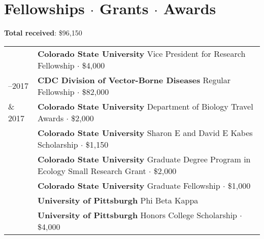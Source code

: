 \documentclass[letterpaper]{deedy-resume} %
\begin{document}

\section{Fellowships $\cdot$ Grants $\cdot$ Awards} 
\raggedright\textbf{Total received}: \$96,150\\
\sectionspace
\begin{tabular}{>{\raggedright\arraybackslash}p{2cm}p{16cm}}
2018 & \textbf{Colorado State University} Vice President for Research Fellowship $\cdot$ \$4,000\\
2015–2017 & \textbf{CDC Division of Vector-Borne Diseases} Regular Fellowship $\cdot$ \$82,000\\
2014 \& 2017 & \textbf{Colorado State University} Department of Biology Travel Awards $\cdot$ \$2,000\\
2015 & \textbf{Colorado State University} Sharon E and David E Kabes Scholarship $\cdot$ \$1,150\\
2014 & \textbf{Colorado State University} Graduate Degree Program in Ecology Small Research Grant $\cdot$ \$2,000\\
2013 & \textbf{Colorado State University} Graduate Fellowship $\cdot$ \$1,000\\
2011 & \textbf{University of Pittsburgh} Phi Beta Kappa\\
2007 & \textbf{University of Pittsburgh} Honors College Scholarship $\cdot$ \$4,000\\
\end{tabular}
\sectionspace

\end{document}

